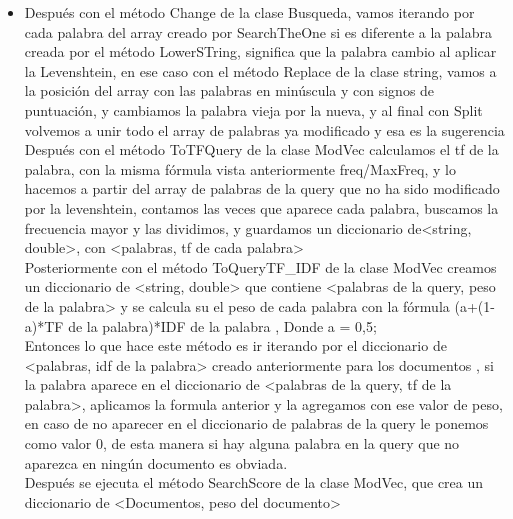 \documentclass[12pt, a4paper]{article}
\begin{document}
\begin{enumerate}
\begin{itemize}
\begin{itemize}
                    \end{itemize}
              \item Después con el método Change de la clase Busqueda,
                    vamos iterando por cada palabra del array creado por SearchTheOne si es diferente
                    a la palabra creada por el método LowerSTring, significa que la palabra
                    cambio al aplicar la Levenshtein, en ese caso con el método Replace de la clase
                    string, vamos a la posición del array con las palabras en minúscula y
                    con signos de puntuación, y cambiamos la palabra vieja por la nueva, y al final
                    con Split volvemos a unir todo el array de palabras ya modificado y esa es la
                    sugerencia\\
                    Después con el método ToTFQuery de la clase ModVec calculamos el
                    tf de la palabra, con la misma fórmula vista anteriormente freq/MaxFreq,
                    y lo hacemos a partir del array de palabras de la query que no ha
                    sido modificado por la levenshtein, contamos las veces que aparece
                    cada palabra, buscamos la frecuencia mayor y las dividimos,
                    y guardamos un diccionario de<string, double>,
                    con <palabras, tf de cada palabra>\\
                    Posteriormente con el método ToQueryTF\_IDF de la clase ModVec
                    creamos un diccionario de <string, double> que contiene
                    <palabras de la query, peso de la palabra> y se calcula su el peso de
                    cada palabra con la fórmula
                    (a+(1-a)*TF de la palabra)*IDF de la palabra , Donde a = 0,5;\\
                    Entonces lo que hace este método es ir iterando por el diccionario de
                    <palabras, idf de la palabra> creado anteriormente para los documentos ,
                    si la palabra aparece en el diccionario de <palabras de la query, tf de la palabra>,
                    aplicamos la formula anterior y la agregamos con ese valor de peso, en caso de no aparecer
                    en el diccionario de palabras de la query le ponemos como valor 0, de esta manera
                    si hay alguna palabra en la query que no aparezca en ningún documento es obviada.\\
                    Después se ejecuta el método SearchScore de la clase ModVec,
                    que crea un diccionario de <Documentos, peso del documento> \\

\end{itemize}
\end{enumerate}
\end{document}
